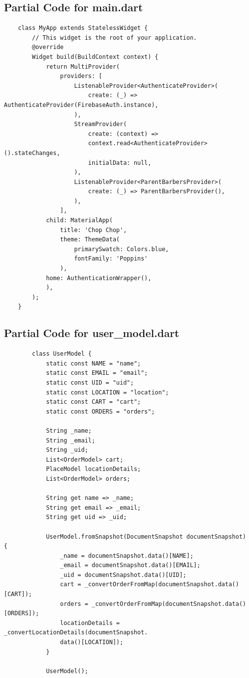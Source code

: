 \documentclass[12pt]{article}
\begin{document}
	\subsection{Partial Code for main.dart}
	\label{code:MyApp}
	\begin{verbatim}
	class MyApp extends StatelessWidget {
		// This widget is the root of your application.
		@override
		Widget build(BuildContext context) {
			return MultiProvider(
				providers: [
					ListenableProvider<AuthenticateProvider>(
						create: (_) => AuthenticateProvider(FirebaseAuth.instance),
					),
					StreamProvider(
						create: (context) =>
						context.read<AuthenticateProvider>().stateChanges, 
						initialData: null,
					),
					ListenableProvider<ParentBarbersProvider>(
						create: (_) => ParentBarbersProvider(),
					),
				],
			child: MaterialApp(
				title: 'Chop Chop',
				theme: ThemeData(
					primarySwatch: Colors.blue,
					fontFamily: 'Poppins'
				),
			home: AuthenticationWrapper(),
			),
		);
	}
	\end{verbatim}

	\subsection{Partial Code for user\_model.dart}
	\label{code:user-model}
	\begin{verbatim}
		class UserModel {
			static const NAME = "name";
			static const EMAIL = "email";
			static const UID = "uid";
			static const LOCATION = "location";
			static const CART = "cart";
			static const ORDERS = "orders";
			
			String _name;
			String _email;
			String _uid;
			List<OrderModel> cart;
			PlaceModel locationDetails;
			List<OrderModel> orders;
			
			String get name => _name;
			String get email => _email;
			String get uid => _uid;
			
			UserModel.fromSnapshot(DocumentSnapshot documentSnapshot) {
				_name = documentSnapshot.data()[NAME];
				_email = documentSnapshot.data()[EMAIL];
				_uid = documentSnapshot.data()[UID];
				cart = _convertOrderFromMap(documentSnapshot.data()[CART]);
				orders = _convertOrderFromMap(documentSnapshot.data()[ORDERS]);
				locationDetails = _convertLocationDetails(documentSnapshot.
				data()[LOCATION]);
			}
			
			UserModel();
	\end{verbatim}
\end{document}
